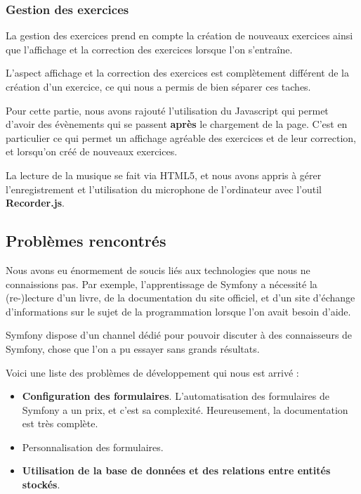 \documentclass[12pt,a4paper]{report}
\begin{document}
\subsubsection{Gestion des exercices}

La gestion des exercices prend en compte la création de nouveaux exercices
ainsi que l'affichage et la correction des exercices lorsque l'on s'entraîne.

L'aspect affichage et la correction des exercices est complètement différent de
la création d'un exercice, ce qui nous a permis de bien séparer ces taches.

Pour cette partie, nous avons rajouté l'utilisation du Javascript qui permet
d'avoir des évènements qui se passent \textbf{après} le chargement de la page.
C'est en particulier ce qui permet un affichage agréable des exercices et de leur correction, et lorsqu'on créé de nouveaux exercices.

La lecture de la musique se fait via HTML5, et nous avons appris à gérer l'enregistrement et l'utilisation du microphone de l'ordinateur avec l'outil \textbf{Recorder.js}\cite{recorderjs}.

\subsection{Problèmes rencontrés}
Nous avons eu énormement de soucis liés aux technologies que nous ne
connaissions pas. Par exemple, l'apprentissage de Symfony a nécessité la (re-)lecture d'un livre, de la documentation du site officiel, et d'un site d'échange d'informations\cite{so} sur le sujet de la programmation lorsque l'on avait besoin d'aide.

Symfony dispose d'un channel dédié\cite{freenode} pour pouvoir discuter à des
connaisseurs de Symfony, chose que l'on a pu essayer sans grands résultats.

Voici une liste des problèmes de développement qui nous est arrivé :

\begin{itemize}
	\item \textbf{Configuration des formulaires}. L'automatisation des 
	formulaires de Symfony a un prix, et c'est sa complexité. Heureusement,
	la documentation\cite{docform} est très complète.
	\item Personnalisation des formulaires. 
	\item \textbf{Utilisation de la base de données et des relations entre entités stockés}.
\end{itemize}
\end{document}
